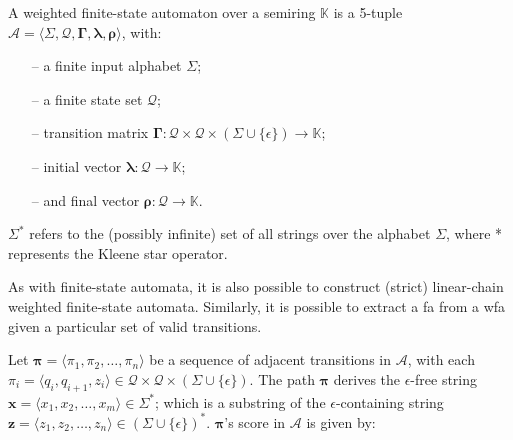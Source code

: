 \begin{definition}
  \label{def:wfa}
  A weighted finite-state automaton over a semiring $\mathbb{K}$ is a 5-tuple
  $\mathcal{A} = \langle \Sigma, \mathcal{Q}, \bm{\Gamma}, \bm{\lambda}, \bm{\rho} \rangle$,
  with:

  \begin{itemize}
    \itemsep0em
    \item[--] a finite input alphabet $\Sigma$;
    \item[--] a finite state set $\mathcal{Q}$;
    \item[--] transition matrix $\bm{\Gamma}: \mathcal{Q} \times \mathcal{Q} \times
    (\Sigma \cup \{\epsilon\}) \rightarrow \mathbb{K}$;
    \item[--] initial vector $\bm{\lambda}: \mathcal{Q} \rightarrow \mathbb{K}$;
    \item[--] and final vector $\bm{\rho}: \mathcal{Q} \rightarrow \mathbb{K}$.
  \end{itemize}

  \begin{remark}
    $\Sigma^{*}$ refers to the (possibly infinite) set of all strings over the
    alphabet $\Sigma$, where * represents the Kleene star operator.
  \end{remark}

  \begin{remark}
    As with finite-state automata, it is also possible to construct (strict)
    linear-chain weighted finite-state automata. Similarly, it is possible to
    extract a \ac{fa} from a \ac{wfa} given a particular set of valid transitions.
  \end{remark}
 
\end{definition}

\begin{definition}

  Let $\bm{\pi} = \langle \pi_1, \pi_2, \dots, \pi_n \rangle$ be a sequence of
  adjacent transitions in $\mathcal{A}$, with each $\pi_i = \langle q_i,
  q_{i+1}, z_i \rangle \in \mathcal{Q} \times \mathcal{Q} \times (\Sigma \cup
  \{\epsilon\})$. The path $\bm{\pi}$ derives the $\epsilon$-free string
  $\bm{x} = \langle x_1, x_2, \dots, x_m \rangle \in \Sigma^{*}$; which is a
  substring of the $\epsilon$-containing string $\bm{z} = \langle z_1, z_2,
  \dots, z_n \rangle \in (\Sigma \cup \{\epsilon\})^{*}$. $\bm{\pi}$'s score in
  $\mathcal{A}$ is given by:
  
\end{definition}

